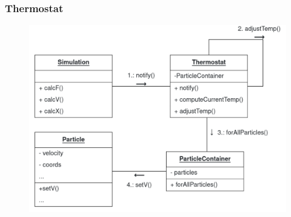 \begin{frame}
	\frametitle{Thermostat}
	\begin{figure}
		\centering
		\includegraphics[width=0.55\linewidth]{ThermoComm}
		\label{fig:thermocomm}
	\end{figure}
\end{frame}

